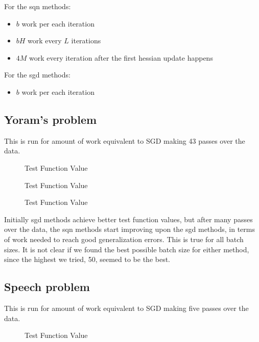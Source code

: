 \documentclass[12pt]{article}
\begin{document}
For the sqn methods:
\begin{itemize}
	\item $b$ work per each iteration
	\item $bH$ work every $L$ iterations
	\item $4M$ work every iteration after the first hessian update happens
\end{itemize}

For the sgd methods:
\begin{itemize}
	\item $b$ work per each iteration 
\end{itemize}



\newpage

\subsection{Yoram's problem}

This is run for amount of work equivalent to SGD making 43 passes over the data. 

\begin{figure}[H]

\caption{Test Function Value}
\end{figure}

\begin{figure}[H]

\caption{Test Function Value}
\end{figure}
\begin{figure}[H]

\caption{Test Function Value}
\end{figure}
Initially sgd methods achieve better test function values, but after many passes over the data, the sqn methods start improving upon the sgd methods, in terms of work needed to reach good generalization errors. This is true for all batch sizes. It is not clear if we found the best possible batch size for either method, since the highest we tried, 50, seemed to be the best. 
\newpage

\subsection{Speech problem}
This is run for amount of work equivalent to SGD making five passes over the data.

\begin{figure}[H]

\caption{Test Function Value}
\end{figure}
\end{document}
